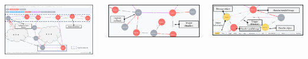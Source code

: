 \documentclass{beamer}
\begin{document}
\begin{frame}
\begin{columns}
	\begin{minipage}[c][0.4\textheight][c]{\linewidth}
		\centering
		\includegraphics[width=\linewidth]{result-1.png}
	\end{minipage}
	\begin{minipage}[c][0.2\textheight][c]{\linewidth}
		\includegraphics[width=\linewidth]{result-2.png}
	\end{minipage}
	\begin{minipage}[c][0.2\textheight][c]{\linewidth}
		\centering
		\includegraphics[width=\linewidth]{result-3.png}
	\end{minipage}
\end{columns}
\end{frame}
\end{document}
